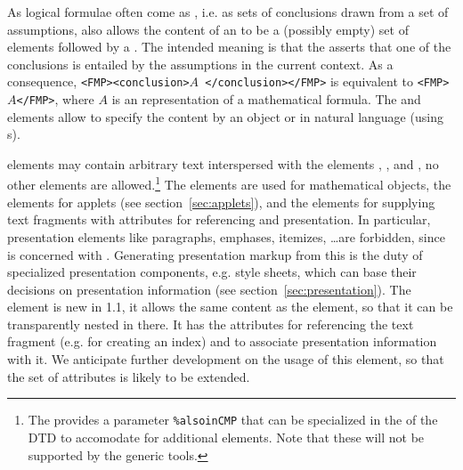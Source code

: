 As logical formulae often come as {}, i.e. as sets of
conclusions drawn from a set of assumptions, {\omdoc} also allows the content of
an {} to be a (possibly empty) set of {} elements
followed by a {}. The intended meaning is that the
{} asserts that one of the conclusions is entailed by the assumptions
in the current context.  As a consequence, {\tt <FMP><conclusion>}$A${\tt
  </conclusion></FMP>} is equivalent to {\tt <FMP>}$A${\tt</FMP>}, where $A$ is an
{\openmath} representation of a mathematical formula. The {}
and {} elements allow to specify the content by an {\openmath}
object or in natural language (using {}s).

{} elements may contain arbitrary text interspersed with the elements
{}, {}, {} and {}, no
other elements are allowed.\footnote{The {} provides a parameter
  {}
  {\tt{\%alsoinCMP}} that can be specialized
  in the {} of the DTD to
  accomodate for additional elements. Note that these will not be supported by the
  generic tools.} The {} elements are used for mathematical
objects, the {} elements for applets (see
section~\ref{sec:applets}), and the {} elements for supplying text
fragments with attributes for referencing and presentation.  In particular,
presentation elements like paragraphs, emphases, itemizes, \ldots are forbidden,
since {\omdoc} is concerned with {}. Generating presentation markup from this is
the duty of specialized presentation components, e.g. {\xslt} style sheets, which
can base their decisions on presentation information (see
section~\ref{sec:presentation}). The {} element is new in {\omdoc}1.1,
it allows the same content as the {} element, so that it can be
transparently nested in there. It has the attributes {} for
referencing the text fragment (e.g. for creating an index) and
{} to associate presentation information with it.  We
anticipate further development on the usage of this element, so that the set of
attributes is likely to be extended.

